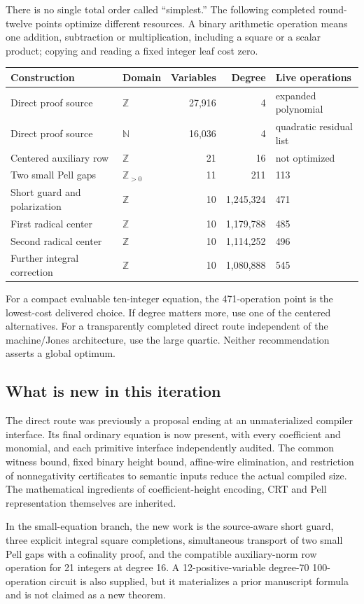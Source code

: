 \documentclass[11pt]{article}
\newcommand{\N}{\mathbb N}
\newcommand{\Z}{\mathbb Z}
\begin{document}
There is no single total order called ``simplest.'' The following completed
round-twelve points optimize different resources. A binary arithmetic operation
means one addition, subtraction or multiplication, including a square or a
scalar product; copying and reading a fixed integer leaf cost zero.
\begin{center}\small
\begin{tabular}{llrrl}
\toprule
Construction & Domain & Variables & Degree & Live operations\\
\midrule
Direct proof source & $\Z$ & 27,916 & 4 & expanded polynomial\\
Direct proof source & $\N$ & 16,036 & 4 & quadratic residual list\\
Centered auxiliary row & $\Z$ & 21 & 16 & not optimized\\
Two small Pell gaps & $\Z_{>0}$ & 11 & 211 & 113\\
Short guard and polarization & $\Z$ & 10 & 1,245,324 & 471\\
First radical center & $\Z$ & 10 & 1,179,788 & 485\\
Second radical center & $\Z$ & 10 & 1,114,252 & 496\\
Further integral correction & $\Z$ & 10 & 1,080,888 & 545\\
\bottomrule
\end{tabular}
\end{center}
For a compact evaluable ten-integer equation, the 471-operation point is the
lowest-cost delivered choice. If degree matters more, use one of the centered
alternatives. For a transparently completed direct route independent of the
machine/Jones architecture, use the large quartic. Neither recommendation
asserts a global optimum.

\subsection{What is new in this iteration}
The direct route was previously a proposal ending at an unmaterialized
compiler interface. Its final ordinary equation is now present, with every
coefficient and monomial, and each primitive interface independently audited.
The common witness bound, fixed binary height bound, affine-wire elimination,
and restriction of nonnegativity certificates to semantic inputs reduce the
actual compiled size. The mathematical ingredients of coefficient-height
encoding, CRT and Pell representation themselves are inherited.

In the small-equation branch, the new work is the source-aware short guard,
three explicit integral square completions, simultaneous transport of two
small Pell gaps with a cofinality proof, and the compatible auxiliary-norm row
operation for 21 integers at degree 16. A 12-positive-variable degree-70
100-operation circuit is also supplied, but it materializes a prior manuscript
formula and is not claimed as a new theorem.
\end{document}
